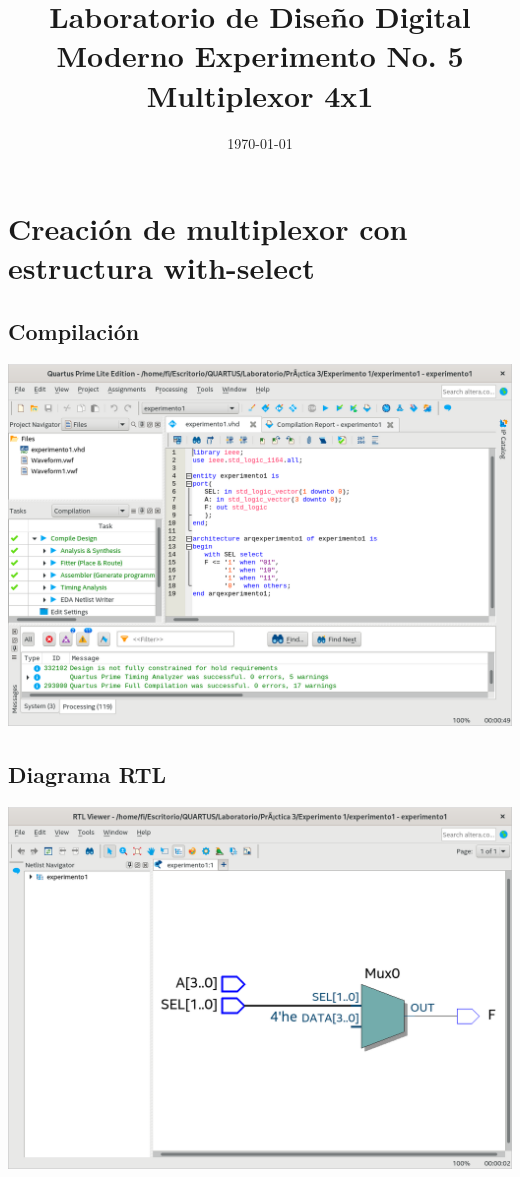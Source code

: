 \documentclass[10pt,a4paper]{article}
\title{Laboratorio de Diseño Digital Moderno Experimento No. 5 Multiplexor 4x1}
\author{}
\date{\today}
\begin{document}
	\maketitle
	
	\section{Creación de multiplexor con estructura with-select}
	\subsection{Compilación}
	\begin{center}
		\includegraphics[scale=0.35]{Compilacion.png}
	\end{center}
	
	\subsection{Diagrama RTL}
	\begin{center}
		\includegraphics[scale=0.35]{RTL.png}
	\end{center}
	
\end{document}
